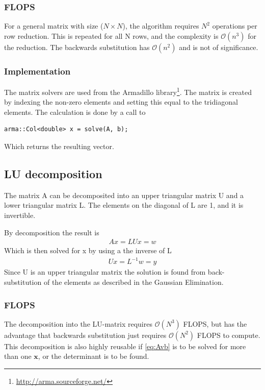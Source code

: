 \documentclass[11pt,a4paper,english,draft]{article}
\numberwithin{equation}{section}
\newcommand{\ve}[1]{\mathbf{#1}} %
\newcommand{\bigO}[1]{\mathcal{O}\left( #1 \right)}
\begin{document}
\subsubsection{FLOPS}
For a general matrix with size ($N\times N$), the algorithm requires
$N^2$ operations per row reduction. This is repeated for all N rows,
and the complexity is $\bigO{n^3}$ for the reduction. The backwards 
substitution has $\bigO{n^2}$ and is not of significance.



\subsubsection{Implementation}
\label{subsubsec:impl_gauss}
The matrix solvers are used from the Armadillo 
library\footnote{\url{http://arma.sourceforge.net/}}. The matrix is
created by indexing the non-zero elements and setting this equal to the 
tridiagonal elements. The calculation is done by a call to 
\begin{lstlisting}
arma::Col<double> x = solve(A, b);
\end{lstlisting}
Which returns the resulting vector.

\subsection{LU decomposition}

The matrix A can be decomposited into an upper triangular matrix U and 
a lower triangular matrix L. The elements on the diagonal of L are 1,
and it is invertible.

By decomposition the result is
\begin{gather}
Ax = LUx = w
\end{gather}
Which is then solved for x by using a the inverse of L
\begin{gather}
Ux = L^{-1}w = y
\end{gather}
Since U is an upper triangular matrix the solution is found from back-substitution
of the elements as described in the Gaussian Elimination.

\subsubsection{FLOPS}
The decomposition into the LU-matrix requires $\bigO{N^3}$ FLOPS, but 
has the advantage that backwards substitution just requires $\bigO{N^2}$
FLOPS to compute. This decomposition is also highly reusable if \eqref{eq:Avb}
is to be solved for more than one $\ve{x}$, or the determinant is to be found.
\end{document}
